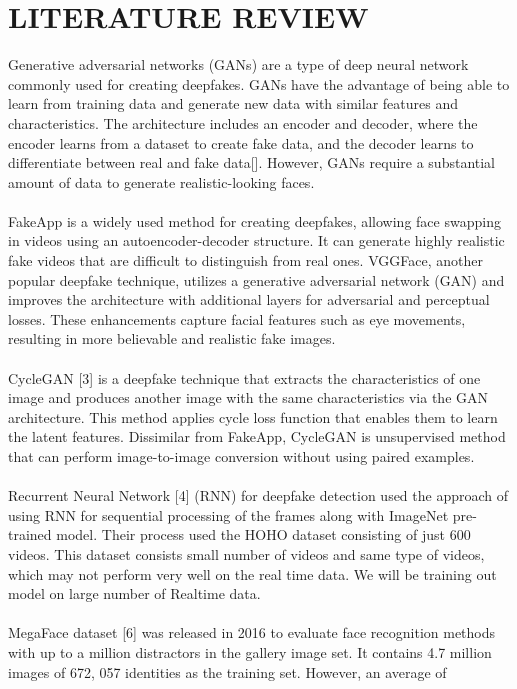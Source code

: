\section{LITERATURE REVIEW}
Generative adversarial networks (GANs) are a type of deep neural network commonly used for creating deepfakes. GANs have the advantage of being able to learn from training data and generate new data with similar features and characteristics. The architecture includes an encoder and decoder, where the encoder learns from a dataset to create fake data, and the decoder learns to differentiate between real and fake data[]. However, GANs require a substantial amount of data to generate realistic-looking faces.
\\\\
FakeApp is a widely used method for creating deepfakes, allowing face swapping in videos using an autoencoder-decoder structure. It can generate highly realistic fake videos that are difficult to distinguish from real ones. VGGFace, another popular deepfake technique, utilizes a generative adversarial network (GAN) and improves the architecture with additional layers for adversarial and perceptual losses. These enhancements capture facial features such as eye movements, resulting in more believable and realistic fake images.
\\\\
CycleGAN [3] is a deepfake technique that extracts the characteristics of one image and produces another image with the same characteristics via the GAN architecture. This method applies cycle loss function that enables them to learn the latent features. Dissimilar from FakeApp, CycleGAN is unsupervised method that can perform image-to-image conversion without using paired examples.
\\\\
Recurrent Neural Network [4] (RNN) for deepfake detection used the approach of using RNN for sequential processing of the frames along with ImageNet pre-trained model. Their process used the HOHO  dataset consisting
of just 600 videos.
This dataset consists small number of videos and same type of videos, which
may not perform very well on the real time data. We will be training out model
on large number of Realtime data.
\\\\
MegaFace dataset [6] was released in 2016 to evaluate
face recognition methods with up to a million distractors
in the gallery image set. It contains 4.7 million images of
672, 057 identities as the training set. However, an average of
